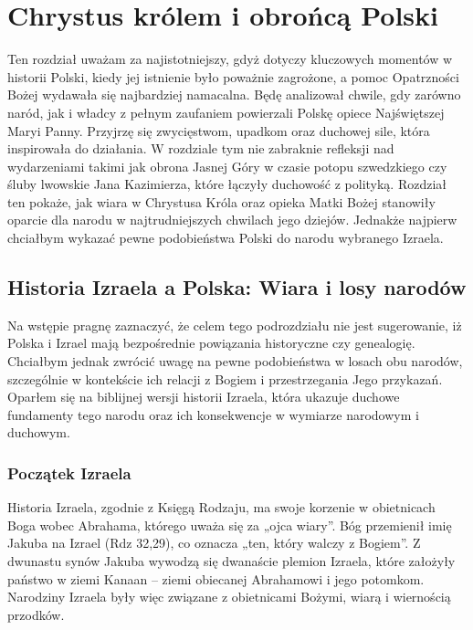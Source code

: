 \section{Chrystus królem i obrońcą Polski}

Ten rozdział uważam za najistotniejszy, gdyż dotyczy kluczowych momentów w
historii Polski, kiedy jej istnienie było poważnie zagrożone, a pomoc Opatrzności Bożej
wydawała się najbardziej namacalna. Będę analizował chwile, gdy zarówno naród, jak i
władcy z pełnym zaufaniem powierzali Polskę opiece Najświętszej Maryi Panny. Przyjrzę
się zwycięstwom, upadkom oraz duchowej sile, która inspirowała do działania. W rozdziale
tym nie zabraknie refleksji nad wydarzeniami takimi jak obrona Jasnej Góry w czasie
potopu szwedzkiego czy śluby lwowskie Jana Kazimierza, które łączyły duchowość z
polityką. Rozdział ten pokaże, jak wiara w Chrystusa Króla oraz opieka Matki Bożej
stanowiły oparcie dla narodu w najtrudniejszych chwilach jego dziejów. Jednakże najpierw
chciałbym wykazać pewne podobieństwa Polski do narodu wybranego Izraela.

\subsection{Historia Izraela a Polska: Wiara i losy narodów}

Na wstępie pragnę zaznaczyć, że celem tego podrozdziału nie jest sugerowanie, iż
Polska i Izrael mają bezpośrednie powiązania historyczne czy genealogię. Chciałbym
jednak zwrócić uwagę na pewne podobieństwa w losach obu narodów, szczególnie w
kontekście ich relacji z Bogiem i przestrzegania Jego przykazań. Oparłem się na biblijnej
wersji historii Izraela, która ukazuje duchowe fundamenty tego narodu oraz ich
konsekwencje w wymiarze narodowym i duchowym.

\subsubsection{Początek Izraela}

Historia Izraela, zgodnie z Księgą Rodzaju, ma swoje korzenie w obietnicach Boga
wobec Abrahama, którego uważa się za „ojca wiary”. Bóg przemienił imię Jakuba na Izrael
(Rdz 32,29), co oznacza „ten, który walczy z Bogiem”. Z dwunastu synów Jakuba wywodzą
się dwanaście plemion Izraela, które założyły państwo w ziemi Kanaan – ziemi obiecanej
Abrahamowi i jego potomkom. Narodziny Izraela były więc związane z obietnicami Bożymi,
wiarą i wiernością przodków.


